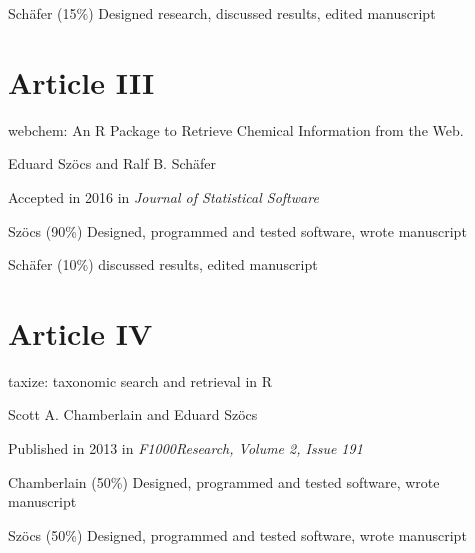 \begin{sloppypar}
\begin{description}
	Schäfer (15\%) Designed research, discussed results, edited manuscript
\end{description}
\normalsize

\vspace{-1em}
\section*{Article III}
\vspace{-1em}
\small
\begin{description}
    \setlength\itemsep{0em}
	\item[Title:] webchem: An R Package to Retrieve Chemical Information from the Web.
	\item[Authors:] Eduard Szöcs and Ralf B. Schäfer
	\item[Status:] Accepted in 2016 in \emph{Journal of Statistical Software}
	\item[Contributions:] Szöcs (90\%) Designed, programmed and tested software, wrote manuscript

	Schäfer (10\%) discussed results, edited manuscript
\end{description}
\normalsize

\vspace{-1em}
\section*{Article IV}
\vspace{-1em}
\small
\begin{description}
    \setlength\itemsep{0em}
	\item[Title:] taxize: taxonomic search and retrieval in R
	\item[Authors:] Scott A. Chamberlain and Eduard Szöcs
	\item[Status:] Published in 2013 in \emph{F1000Research, Volume 2, Issue 191}
	\item[Contributions:] Chamberlain (50\%) Designed, programmed and tested software, wrote manuscript

	Szöcs (50\%) Designed, programmed and tested software, wrote manuscript
\end{description}
\end{sloppypar}


\restoregeometry
